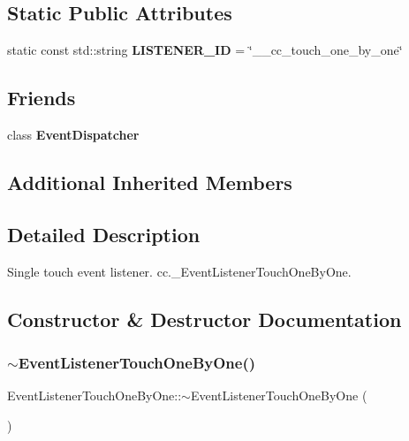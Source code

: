 \subsection*{Static Public Attributes}
\begin{DoxyCompactItemize}
\item 
\mbox{\label{classEventListenerTouchOneByOne_aa59d3627e145d66367d3fd9c4e5f53d0}} 
static const std\+::string {\bfseries L\+I\+S\+T\+E\+N\+E\+R\+\_\+\+ID} = \char`\"{}\+\_\+\+\_\+cc\+\_\+touch\+\_\+one\+\_\+by\+\_\+one\char`\"{}
\end{DoxyCompactItemize}
\subsection*{Friends}
\begin{DoxyCompactItemize}
\item 
\mbox{\label{classEventListenerTouchOneByOne_a7de0ed02fc316d9e73b7eb3def69c105}} 
class {\bfseries Event\+Dispatcher}
\end{DoxyCompactItemize}
\subsection*{Additional Inherited Members}


\subsection{Detailed Description}
Single touch event listener.  cc.\+\_\+\+Event\+Listener\+Touch\+One\+By\+One. 

\subsection{Constructor \& Destructor Documentation}
\mbox{\label{classEventListenerTouchOneByOne_a6c2f83789b664808c1bf06865e1cfb8d}} 
\subsubsection{\texorpdfstring{$\sim$\+Event\+Listener\+Touch\+One\+By\+One()}{~EventListenerTouchOneByOne()}\hspace{0.1cm}{\footnotesize\ttfamily [1/2]}}
{\footnotesize\ttfamily Event\+Listener\+Touch\+One\+By\+One\+::$\sim$\+Event\+Listener\+Touch\+One\+By\+One (\begin{DoxyParamCaption}{ }\end{DoxyParamCaption})\hspace{0.3cm}{\ttfamily [virtual]}}

